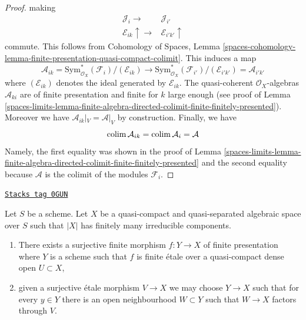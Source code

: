 \begin{proof}
making
$$
\begin{array}{cc}\mathcal{J}_i \longrightarrow & \mathcal{J}_{i'} \\ \mathcal{E}_{ik} \uparrow\longrightarrow & \mathcal{E}_{i'k'} \uparrow\end{array}
$$
commute. This follows from Cohomology of Spaces, Lemma
\ref{spaces-cohomology-lemma-finite-presentation-quasi-compact-colimit}.
This induces a map
$$
\mathcal{A}_{ik} =
\text{Sym}^*_{\mathcal{O}_X}(\mathcal{F}_i)/(\mathcal{E}_{ik})
\longrightarrow
\text{Sym}^*_{\mathcal{O}_X}(\mathcal{F}_{i'})/(\mathcal{E}_{i'k'}) =
\mathcal{A}_{i'k'}
$$
where $(\mathcal{E}_{ik})$ denotes the ideal generated by $\mathcal{E}_{ik}$.
The quasi-coherent $\mathcal{O}_X$-algebras $\mathcal{A}_{ki}$
are of finite presentation and finite for $k$ large enough
(see proof of
Lemma \ref{spaces-limits-lemma-finite-algebra-directed-colimit-finite-finitely-presented}).
Moreover we have $\mathcal{A}_{ik}|_V = \mathcal{A}|_V$ by construction.
Finally, we have
$$
\operatorname{colim} \mathcal{A}_{ik} = \operatorname{colim} \mathcal{A}_i = \mathcal{A}
$$
Namely, the first equality was shown in the proof of
Lemma \ref{spaces-limits-lemma-finite-algebra-directed-colimit-finite-finitely-presented}
and the second equality because $\mathcal{A}$ is the colimit of
the modules $\mathcal{F}_i$.
\end{proof}

\begin{lemma}
\label{spaces-limits-lemma-there-is-a-scheme-finite-over-refined}
\href{https://stacks.math.columbia.edu/tag/0GUN}{\texttt{Stacks tag 0GUN}}

Let $S$ be a scheme. Let $X$ be a quasi-compact and quasi-separated
algebraic space over $S$ such that $|X|$ has finitely many irreducible
components.
\begin{enumerate}
\item There exists a surjective finite morphism $f : Y \to X$
of finite presentation where $Y$ is a scheme such that $f$
is finite \'etale over a quasi-compact dense open $U \subset X$,
\item given a surjective \'etale morphism $V \to X$ we may choose
$Y \to X$ such that for every $y \in Y$ there is an open neighbourhood
$W \subset Y$ such that $W \to X$ factors through $V$.
\end{enumerate}
\end{lemma}

